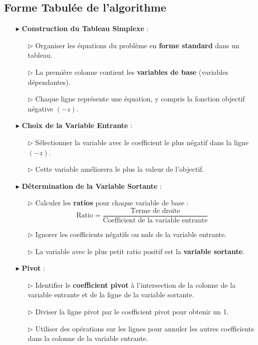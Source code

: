 \documentclass{report}
\begin{document}
\begin{multicols*}{2}
\section{Forme Tabulée de l'algorithme}
\begin{itemize}
    \item[$\blacktriangleright$] \textbf{Construction du Tableau Simplexe} :
    \begin{itemize}
        \item[$\rhd$] Organiser les équations du problème en \textbf{forme standard} dans un tableau.
        \item[$\rhd$] La première colonne contient les \textbf{variables de base} (variables dépendantes).
        \item[$\rhd$] Chaque ligne représente une équation, y compris la fonction objectif négative $(-z)$.
    \end{itemize}
    
    \item[$\blacktriangleright$] \textbf{Choix de la Variable Entrante} :
    \begin{itemize}
        \item[$\rhd$] Sélectionner la variable avec le coefficient le plus négatif dans la ligne $(-z)$.
        \item[$\rhd$] Cette variable améliorera le plus la valeur de l'objectif.
    \end{itemize}
    
    \item[$\blacktriangleright$] \textbf{Détermination de la Variable Sortante} :
    \begin{itemize}
        \item[$\rhd$] Calculer les \textbf{ratios} pour chaque variable de base :
        \[
        \boxed{\text{Ratio} = \dfrac{\text{Terme de droite}}{\text{Coefficient de la variable entrante}}}
        \]
        \item[$\rhd$] Ignorer les coefficients négatifs ou nuls de la variable entrante.
        \item[$\rhd$] La variable avec le plus petit ratio positif est la \textbf{variable sortante}.
    \end{itemize}
    
    \item[$\blacktriangleright$] \textbf{Pivot} :
    \begin{itemize}
        \item[$\rhd$] Identifier le \textbf{coefficient pivot} à l'intersection de la colonne de la variable entrante et de la ligne de la variable sortante.
        \item[$\rhd$] Diviser la ligne pivot par le coefficient pivot pour obtenir un 1.
        \item[$\rhd$] Utiliser des opérations sur les lignes pour annuler les autres coefficients dans la colonne de la variable entrante.
    \end{itemize}
    

\end{itemize}
\end{multicols*}
\end{document}
